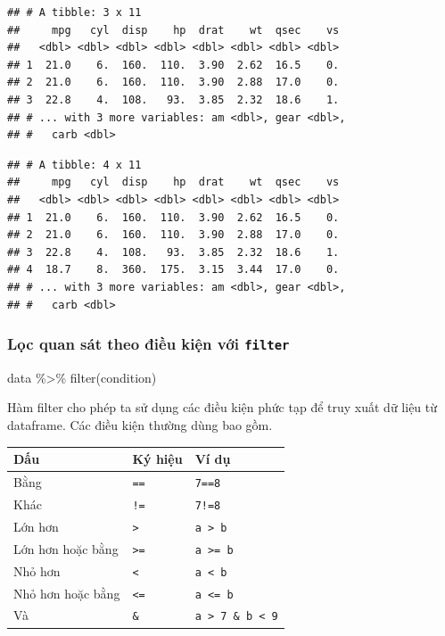 \documentclass[]{krantz}
\makeatletter
\newenvironment{Shaded}{\begin{snugshade}}{\end{snugshade}}
\newcommand{\CommentTok}[1]{\textcolor[rgb]{0.37,0.37,0.37}{\textit{#1}}}
\newcommand{\DecValTok}[1]{\textcolor[rgb]{0.06,0.06,0.06}{#1}}
\newcommand{\KeywordTok}[1]{\textcolor[rgb]{0.27,0.27,0.27}{\textbf{#1}}}
\newcommand{\NormalTok}[1]{#1}
\newcommand{\OperatorTok}[1]{\textcolor[rgb]{0.43,0.43,0.43}{\textbf{#1}}}
\newcommand{\StringTok}[1]{\textcolor[rgb]{0.5,0.5,0.5}{#1}}
\renewenvironment{quote}{\begin{VF}}{\end{VF}}
\newenvironment{kframe}{%
\medskip{}
\setlength{\fboxsep}{.8em}
 \def\at@end@of@kframe{}%
 \ifinner\ifhmode%
  \def\at@end@of@kframe{\end{minipage}}%
  \begin{minipage}{\columnwidth}%
 \fi\fi%
 \def\FrameCommand##1{\hskip\@totalleftmargin \hskip-\fboxsep
 \colorbox{shadecolor}{##1}\hskip-\fboxsep
     \hskip-\linewidth \hskip-\@totalleftmargin \hskip\columnwidth}%
 \MakeFramed {\advance\hsize-\width
   \@totalleftmargin\z@ \linewidth\hsize
   \@setminipage}}%
 {\par\unskip\endMakeFramed%
 \at@end@of@kframe}
\renewenvironment{Shaded}{\begin{kframe}}{\end{kframe}}
\renewenvironment{Shaded}{\begin{snugshade}}{\end{snugshade}}
\renewcommand{\CommentTok}[1]{\textcolor[rgb]{0.56,0.35,0.01}{\textit{#1}}}
\renewcommand{\DecValTok}[1]{\textcolor[rgb]{0.00,0.00,0.81}{#1}}
\renewcommand{\KeywordTok}[1]{\textcolor[rgb]{0.13,0.29,0.53}{\textbf{#1}}}
\renewcommand{\NormalTok}[1]{#1}
\renewcommand{\OperatorTok}[1]{\textcolor[rgb]{0.81,0.36,0.00}{\textbf{#1}}}
\renewcommand{\StringTok}[1]{\textcolor[rgb]{0.31,0.60,0.02}{#1}}
\theoremstyle{definition}
\theoremstyle{definition}
\theoremstyle{definition}
\theoremstyle{remark}
\makeatother
\begin{document}
\begin{verbatim}
## # A tibble: 3 x 11
##     mpg   cyl  disp    hp  drat    wt  qsec    vs
##   <dbl> <dbl> <dbl> <dbl> <dbl> <dbl> <dbl> <dbl>
## 1  21.0    6.  160.  110.  3.90  2.62  16.5    0.
## 2  21.0    6.  160.  110.  3.90  2.88  17.0    0.
## 3  22.8    4.  108.   93.  3.85  2.32  18.6    1.
## # ... with 3 more variables: am <dbl>, gear <dbl>,
## #   carb <dbl>
\end{verbatim}

\begin{Shaded}
\end{Shaded}

\begin{verbatim}
## # A tibble: 4 x 11
##     mpg   cyl  disp    hp  drat    wt  qsec    vs
##   <dbl> <dbl> <dbl> <dbl> <dbl> <dbl> <dbl> <dbl>
## 1  21.0    6.  160.  110.  3.90  2.62  16.5    0.
## 2  21.0    6.  160.  110.  3.90  2.88  17.0    0.
## 3  22.8    4.  108.   93.  3.85  2.32  18.6    1.
## 4  18.7    8.  360.  175.  3.15  3.44  17.0    0.
## # ... with 3 more variables: am <dbl>, gear <dbl>,
## #   carb <dbl>
\end{verbatim}

\hypertarget{loc-quan-sat-theo-iu-kin-vi-filter}{%
\subsubsection{\texorpdfstring{Lọc quan sát theo điều kiện với
\texttt{filter}}{Lọc quan sát theo điều kiện với filter}}\label{loc-quan-sat-theo-iu-kin-vi-filter}}

\begin{quote}
data \%\textgreater{}\% filter(condition)
\end{quote}

Hàm filter cho phép ta sử dụng các điều kiện phức tạp để truy xuất dữ
liệu từ dataframe. Các điều kiện thường dùng bao gồm.

\begin{longtable}[]{@{}lll@{}}
\toprule
Dấu & Ký hiệu & Ví dụ\tabularnewline
\midrule
\endhead
Bằng & \texttt{==} & \texttt{7==8}\tabularnewline
Khác & \texttt{!=} & \texttt{7!=8}\tabularnewline
Lớn hơn & \texttt{\textgreater{}} &
\texttt{a\ \textgreater{}\ b}\tabularnewline
Lớn hơn hoặc bằng & \texttt{\textgreater{}=} &
\texttt{a\ \textgreater{}=\ b}\tabularnewline
Nhỏ hơn & \texttt{\textless{}} &
\texttt{a\ \textless{}\ b}\tabularnewline
Nhỏ hơn hoặc bằng & \texttt{\textless{}=} &
\texttt{a\ \textless{}=\ b}\tabularnewline
Và & \texttt{\&} &
\texttt{a\ \textgreater{}\ 7\ \&\ b\ \textless{}\ 9}\tabularnewline
\bottomrule
\end{longtable}
\end{document}

